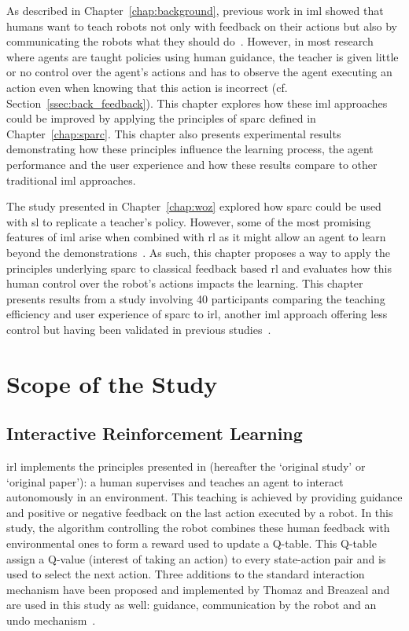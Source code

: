 As described in Chapter~\ref{chap:background}, previous work in \gls{iml} showed that humans want to teach robots not only with feedback on their actions but also by communicating the robots what they should do~\citep{thomaz2008teachable,amershi2014power}. However, in most research where agents are taught policies using human guidance, the teacher is given little or no control over the agent's actions and has to observe the agent executing an action even when knowing that this action is incorrect (cf. Section~\ref{ssec:back_feedback}). This chapter explores how these \gls{iml} approaches could be improved by applying the principles of \gls{sparc} defined in Chapter~\ref{chap:sparc}. This chapter also presents experimental results demonstrating how these principles influence the learning process, the agent performance and the user experience and how these results compare to other traditional \gls{iml} approaches.

The study presented in Chapter~\ref{chap:woz} explored how \gls{sparc} could be used with \acrlong{sl} to replicate a teacher's policy. However, some of the most promising features of \gls{iml} arise when combined with \gls{rl} as it might allow an agent to learn beyond the demonstrations~\citep{abbeel2004apprenticeship}. As such, this chapter proposes a way to apply the principles underlying \gls{sparc} to classical feedback based \gls{rl} and evaluates how this human control over the robot's actions impacts the learning. This chapter presents results from a study involving 40 participants comparing the teaching efficiency and user experience of \gls{sparc} to \gls{irl}, another \gls{iml} approach offering less control but having been validated in previous studies~\citep{thomaz2008teachable}. 

\section{Scope of the Study}

\subsection{Interactive Reinforcement Learning}

\gls{irl} implements the principles presented in \cite{thomaz2008teachable} (hereafter the `original study' or `original paper'): a human supervises and teaches an agent to interact autonomously in an environment. This teaching is achieved by providing guidance and positive or negative feedback on the last action executed by a robot. In this study, the algorithm controlling the robot combines these human feedback with environmental ones to form a reward used to update a Q-table. This Q-table assign a Q-value (interest of taking an action) to every state-action pair and is used to select the next action. Three additions to the standard interaction mechanism have been proposed and implemented by Thomaz and Breazeal and are used in this study as well: guidance, communication by the robot and an undo mechanism~\citep{thomaz2008teachable}. 

